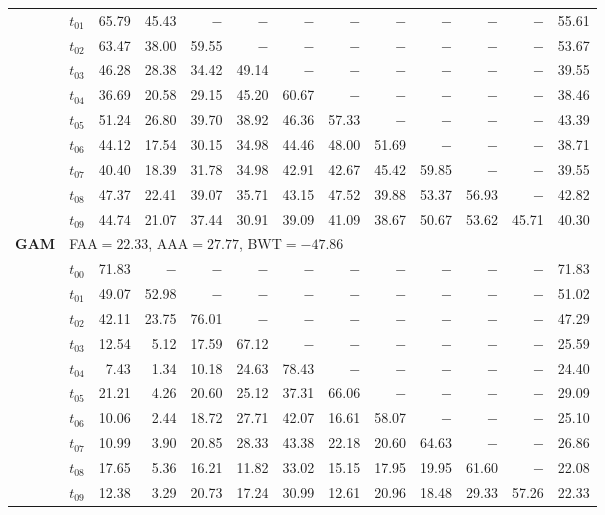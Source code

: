 \begin{table}[ht]
\begin{tabular}{@{}l l r r r r r r r r r r r@{}}
 & $t_{01}$ & 65.79 & 45.43 & $-$ & $-$ & $-$ & $-$ & $-$ & $-$ & $-$ & $-$ & 55.61 \\
 & $t_{02}$ & 63.47 & 38.00 & 59.55 & $-$ & $-$ & $-$ & $-$ & $-$ & $-$ & $-$ & 53.67 \\
 & $t_{03}$ & 46.28 & 28.38 & 34.42 & 49.14 & $-$ & $-$ & $-$ & $-$ & $-$ & $-$ & 39.55 \\
 & $t_{04}$ & 36.69 & 20.58 & 29.15 & 45.20 & 60.67 & $-$ & $-$ & $-$ & $-$ & $-$ & 38.46 \\
 & $t_{05}$ & 51.24 & 26.80 & 39.70 & 38.92 & 46.36 & 57.33 & $-$ & $-$ & $-$ & $-$ & 43.39 \\
 & $t_{06}$ & 44.12 & 17.54 & 30.15 & 34.98 & 44.46 & 48.00 & 51.69 & $-$ & $-$ & $-$ & 38.71 \\
 & $t_{07}$ & 40.40 & 18.39 & 31.78 & 34.98 & 42.91 & 42.67 & 45.42 & 59.85 & $-$ & $-$ & 39.55 \\
 & $t_{08}$ & 47.37 & 22.41 & 39.07 & 35.71 & 43.15 & 47.52 & 39.88 & 53.37 & 56.93 & $-$ & 42.82 \\
 & $t_{09}$ & 44.74 & 21.07 & 37.44 & 30.91 & 39.09 & 41.09 & 38.67 & 50.67 & 53.62 & 45.71 & 40.30 \\
\midrule
\multirow{11}{*}{\textbf{GAM}} & \multicolumn{12}{l}{\quad\small FAA$=22.33$,\; AAA$=27.77$,\; BWT$=-47.86$} \\
 & $t_{00}$ & 71.83 & $-$ & $-$ & $-$ & $-$ & $-$ & $-$ & $-$ & $-$ & $-$ & 71.83 \\
 & $t_{01}$ & 49.07 & 52.98 & $-$ & $-$ & $-$ & $-$ & $-$ & $-$ & $-$ & $-$ & 51.02 \\
 & $t_{02}$ & 42.11 & 23.75 & 76.01 & $-$ & $-$ & $-$ & $-$ & $-$ & $-$ & $-$ & 47.29 \\
 & $t_{03}$ & 12.54 & 5.12 & 17.59 & 67.12 & $-$ & $-$ & $-$ & $-$ & $-$ & $-$ & 25.59 \\
 & $t_{04}$ & 7.43 & 1.34 & 10.18 & 24.63 & 78.43 & $-$ & $-$ & $-$ & $-$ & $-$ & 24.40 \\
 & $t_{05}$ & 21.21 & 4.26 & 20.60 & 25.12 & 37.31 & 66.06 & $-$ & $-$ & $-$ & $-$ & 29.09 \\
 & $t_{06}$ & 10.06 & 2.44 & 18.72 & 27.71 & 42.07 & 16.61 & 58.07 & $-$ & $-$ & $-$ & 25.10 \\
 & $t_{07}$ & 10.99 & 3.90 & 20.85 & 28.33 & 43.38 & 22.18 & 20.60 & 64.63 & $-$ & $-$ & 26.86 \\
 & $t_{08}$ & 17.65 & 5.36 & 16.21 & 11.82 & 33.02 & 15.15 & 17.95 & 19.95 & 61.60 & $-$ & 22.08 \\
 & $t_{09}$ & 12.38 & 3.29 & 20.73 & 17.24 & 30.99 & 12.61 & 20.96 & 18.48 & 29.33 & 57.26 & 22.33 \\

\end{tabular}
\end{table}
